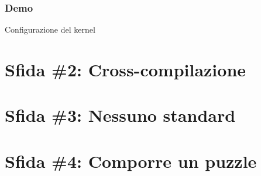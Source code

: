 \documentclass[xetex,table]{beamer}
\begin{document}
\begin{frame}
\frametitle[Demo! Configurazione del kernel]{Demo}
  \begin{center}
    \LARGE
    Configurazione del kernel
  \end{center}
\end{frame}

\section{Sfida \#2: Cross-compilazione}

\section{Sfida \#3: Nessuno standard}

\section{Sfida \#4: Comporre un puzzle}
\end{document}
